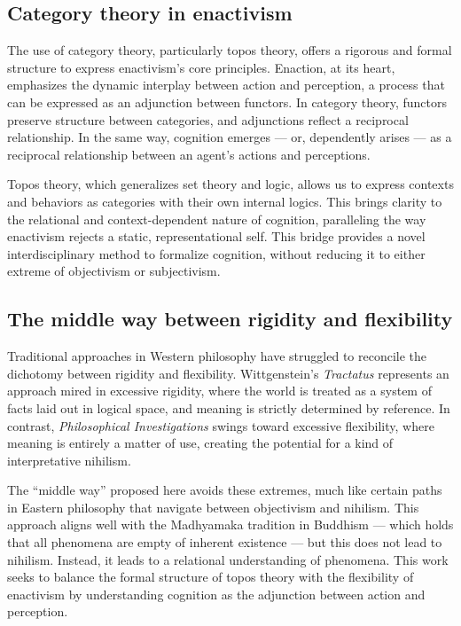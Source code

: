 \documentclass{article}
\begin{document}
\subsection{Category theory in enactivism}
The use of category theory, particularly topos theory, offers a rigorous and formal structure to express enactivism's core principles. Enaction, at its heart, emphasizes the dynamic interplay between action and perception, a process that can be expressed as an adjunction between functors. In category theory, functors preserve structure between categories, and adjunctions reflect a reciprocal relationship. In the same way, cognition emerges --- or, dependently arises --- as a reciprocal relationship between an agent's actions and perceptions.

Topos theory, which generalizes set theory and logic, allows us to express contexts and behaviors as categories with their own internal logics. This brings clarity to the relational and context-dependent nature of cognition, paralleling the way enactivism rejects a static, representational self. This bridge provides a novel interdisciplinary method to formalize cognition, without reducing it to either extreme of objectivism or subjectivism.

\subsection{The middle way between rigidity and flexibility}
Traditional approaches in Western philosophy have struggled to reconcile the dichotomy between rigidity and flexibility. Wittgenstein's \emph{Tractatus} represents an approach mired in excessive rigidity, where the world is treated as a system of facts laid out in logical space, and meaning is strictly determined by reference. In contrast, \emph{Philosophical Investigations} swings toward excessive flexibility, where meaning is entirely a matter of use, creating the potential for a kind of interpretative nihilism.

The ``middle way'' proposed here avoids these extremes, much like certain paths in Eastern philosophy that navigate between objectivism and nihilism. This approach aligns well with the Madhyamaka tradition in Buddhism --- which holds that all phenomena are empty of inherent existence --- but this does not lead to nihilism. Instead, it leads to a relational understanding of phenomena. This work seeks to balance the formal structure of topos theory with the flexibility of enactivism by understanding cognition as the adjunction between action and perception.
\end{document}
